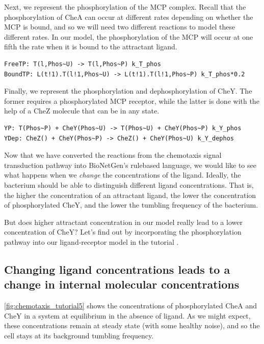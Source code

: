 Next, we represent the phosphorylation of the MCP complex. Recall that the phosphorylation of CheA can occur at different rates depending on whether the MCP is bound, and so we will need two different reactions to model these different rates. In our model, the phosphorylation of the MCP will occur at one fifth the rate when it is bound to the attractant ligand.

\begin{verbatim}
FreeTP: T(l,Phos~U) -> T(l,Phos~P) k_T_phos   
BoundTP: L(t!1).T(l!1,Phos~U) -> L(t!1).T(l!1,Phos~P) k_T_phos*0.2
\end{verbatim}

Finally, we represent the phosphorylation and dephosphorylation of CheY. The former requires a phosphorylated MCP receptor, while the latter is done with the help of a CheZ molecule that can be in any state.

\begin{verbatim}
YP: T(Phos~P) + CheY(Phos~U) -> T(Phos~U) + CheY(Phos~P) k_Y_phos
YDep: CheZ() + CheY(Phos~P) -> CheZ() + CheY(Phos~U) k_Y_dephos
\end{verbatim}

Now that we have converted the reactions from the chemotaxis signal transduction pathway into BioNetGen's rule\-based language, we would like to see what happens when we \textit{change} the concentrations of the ligand. Ideally, the bacterium should be able to distinguish different ligand concentrations. That is, the higher the concentration of an attractant ligand, the lower the concentration of phosphorylated CheY, and the lower the tumbling frequency of the bacterium.

But does higher attractant concentration in our model really lead to a lower concentration of CheY? Let's find out by incorporating the phosphorylation pathway into our ligand-receptor model in the tutorial .


\FloatBarrier
{}
{}
\subsection{Changing ligand concentrations leads to a change in internal molecular concentrations}

\autoref{fig:chemotaxis_tutorial5} shows the concentrations of phosphorylated CheA and CheY in a system at equilibrium in the absence of ligand. As we might expect, these concentrations remain at steady state (with some healthy noise), and so the cell stays at its background tumbling frequency.

